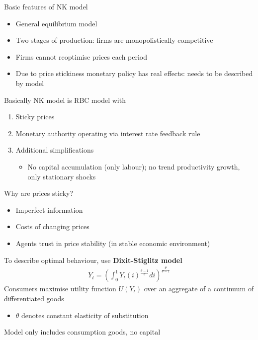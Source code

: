 \documentclass{beamer}
\begin{document}
\begin{frame}
  Basic features of NK model
  \begin{itemize}
    \item General equilibrium model
    \item Two stages of production: firms are monopolistically competitive
    \item Firms cannot reoptimise prices each period
    \item Due to price stickiness monetary policy has real effects: needs to be described by model
  \end{itemize}
  \medskip
  Basically NK model is RBC model with
  \begin{enumerate}
    \item Sticky prices
    \item Monetary authority operating via interest rate feedback rule
    \item Additional simplifications
    \begin{itemize}
      \item No capital accumulation (only labour); no trend productivity growth, only stationary shocks 
    \end{itemize}
  \end{enumerate}
\end{frame}

\begin{frame}
  Why are prices sticky?
  \begin{itemize}
    \item Imperfect information
    \item Costs of changing prices
    \item Agents trust in price stability (in stable economic environment)
  \end{itemize}
\end{frame}


\begin{frame}
 To describe optimal behaviour, use \textbf{Dixit-Stiglitz model}\\
\begin{align}
  Y_t=\left( \int_0^1 Y_t(i)^{\frac{\theta-1}{\theta}}di\right)^{\frac{\theta}{\theta-1}}
\end{align}
Consumers maximise utility function $U(Y_t)$ over an aggregate of a continuum of differentiated goods
\begin{itemize}
  \item $\theta$ denotes constant elasticity of substitution
\end{itemize}
\medskip
 Model only includes consumption goods, no capital
\end{frame}
\end{document}
